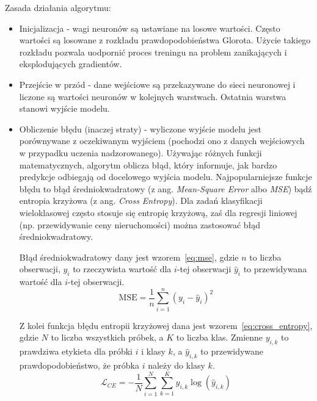 Zasada działania algorytmu:
\begin{itemize}
    \item Inicjalizacja - wagi neuronów są ustawiane na losowe wartości.
    Często wartości są losowane z rozkładu prawdopodobieństwa Glorota.
    Użycie takiego rozkładu pozwala uodpornić proces treningu na problem zanikających i eksplodujących gradientów.
    \item Przejście w przód - dane wejściowe są przekazywane do sieci neuronowej i liczone są wartości neuronów w kolejnych warstwach.
    Ostatnia warstwa stanowi wyjście modelu.
    \item Obliczenie błędu (inaczej straty) - wyliczone wyjście modelu jest porównywane z oczekiwanym wyjściem (pochodzi ono z danych wejściowych w przypadku uczenia nadzorowanego).
    Używając różnych funkcji matematycznych, algorytm oblicza błąd, który informuje, jak bardzo predykcje odbiegają od docelowego wyjścia modelu.
    Najpopularniejsze funkcje błędu to błąd średniokwadratowy (z ang. \textit{Mean-Square Error} albo \textit{MSE}) bądź entropia krzyżowa (z ang. \textit{Cross Entropy}).
    Dla zadań klasyfikacji wieloklasowej często stosuje się entropię krzyżową, zaś dla regresji liniowej (np.
    przewidywanie ceny nieruchomości) można zastosować błąd średniokwadratowy.

    Błąd średniokwadratowy dany jest wzorem~\ref{eq:mse}, gdzie $n$ to liczba obserwacji, $y_i$ to rzeczywista wartość dla $i$-tej obserwacji $\hat{y}_i$ to przewidywana wartość dla $i$-tej obserwacji.
    \begin{equation}
        \text{MSE} = \frac{1}{n} \sum_{i=1}^{n} (y_i - \hat{y}_i)^2\label{eq:mse}
    \end{equation}

    Z kolei funkcja błędu entropii krzyżowej dana jest wzorem~\ref{eq:cross_entropy}, gdzie $N$ to liczba wszystkich próbek, a $K$ to liczba klas.
    Zmienne $y_{i,k}$ to prawdziwa etykieta dla próbki $i$ i klasy $k$, a $\hat{y}_{i,k}$ to przewidywane prawdopodobieństwo, że próbka $i$ należy do klasy $k$.
    \begin{equation}
        \mathcal{L}_{CE} = -\frac{1}{N} \sum_{i=1}^{N} \sum_{k=1}^{K} y_{i,k} \log(\hat{y}_{i,k})\label{eq:cross_entropy}
    \end{equation}


\end{itemize}
